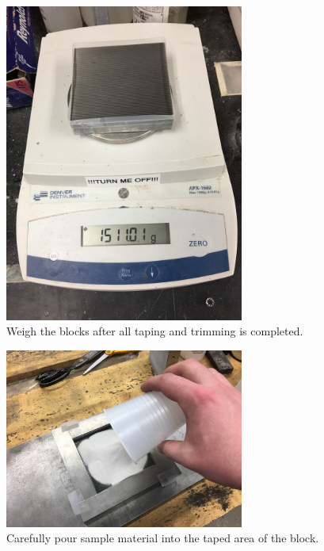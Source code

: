 \clearpage

\begin{figure}
	\centering
        \includegraphics[width=0.7\textwidth]{appendix_sample_prep/dds_block_weight.jpg}
   	\caption{Weigh the blocks after all taping and trimming is completed.}
  	\label{Fig:dds_block_weight}
\end{figure}

\begin{figure}
	\centering
        \includegraphics[width=0.7\textwidth]{appendix_sample_prep/dds_pour_material.jpg}
   	\caption{Carefully pour sample material into the taped area of the block.}
  	\label{Fig:dds_pour_material}
\end{figure}

